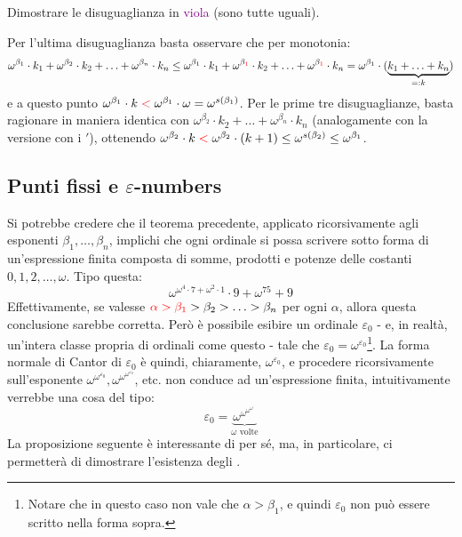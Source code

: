 \begin{exercise}
	Dimostrare le disuguaglianza in \textcolor{purple}{viola} (sono tutte uguali).
\end{exercise}

\begin{soln}
	Per l'ultima disuguaglianza basta osservare che per monotonia:
	\[ \omega^{\beta_1} \cdot k_1 + \omega^{\beta_2} \cdot k_2 + \ldots + \omega^{\beta_n} \cdot k_n \leq \omega^{\beta_1} \cdot k_1 + \omega^{\beta_{\textcolor{red}1}} \cdot k_2 + \ldots + \omega^{\beta_{\textcolor{red}1}} \cdot k_n = \omega^{\beta_1} \cdot (\underbrace{k_1 + \ldots + k_n}_{=: k})
		\]
	e a questo punto $\omega^{\beta_1} \cdot k \;\textcolor{red}{<}\; \omega^{\beta_1} \cdot \omega = \omega^{s(\beta_1)}$. Per le prime tre disuguaglianze, basta ragionare in maniera identica con $\omega^{\beta_2} \cdot k_2 + \ldots + \omega^{\beta_n} \cdot k_n$ (analogamente con la versione con i $'$), ottenendo
	$\omega^{\beta_2} \cdot k \;\textcolor{red}{<}\; \omega^{\beta_2} \cdot (k + 1) \leq \omega^{s(\beta_2)} \leq \omega^{\beta_1}$.
\end{soln}

\subsection{Punti fissi e \texorpdfstring{$\varepsilon$}{epsilon}-numbers}
Si potrebbe credere che il teorema precedente, applicato ricorsivamente agli esponenti $\beta_1,\ldots,\beta_n$, implichi che ogni ordinale
si possa scrivere sotto forma di un'espressione finita composta di somme, prodotti e potenze delle costanti $0,1,2,\ldots,\omega$. Tipo questa:
\[ \omega^{\omega^4 \cdot 7 + \omega^2 \cdot 1}\cdot 9 + \omega^{75} + 9
	\]
Effettivamente, se valesse $\textcolor{red}{\alpha > \beta_1}>\beta_2>\ldots>\beta_n$ per ogni $\alpha$, allora questa conclusione sarebbe corretta.
Però è possibile esibire un ordinale $\varepsilon_0$ - e, in realtà, un'intera classe propria di ordinali come questo - tale che $\varepsilon_0 = \omega^{\varepsilon_0}$\footnote{Notare che in questo caso non vale che $\alpha > \beta_1$, e quindi $\varepsilon_0$ non può essere scritto nella forma sopra.}.
La forma normale di Cantor di $\varepsilon_0$ è quindi, chiaramente, $\omega^{\varepsilon_0}$, e procedere ricorsivamente sull'esponente $\omega^{\omega^{\varepsilon_0}},\omega^{\omega^{\omega^{\varepsilon_0}}}$, etc. non conduce ad un'espressione finita, intuitivamente verrebbe una cosa del tipo:
\[ \varepsilon_0 = \underbrace{\omega^{\omega^{\omega^{\omega^{\iddots}}}}}_{\text{$\omega$ volte}}
	\]
La proposizione seguente è interessante di per sé, ma, in particolare, ci permetterà di dimostrare l'esistenza degli .

